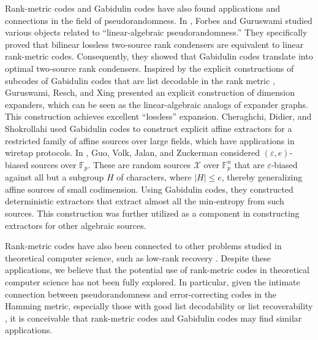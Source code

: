 \documentclass[11pt]{article}
\newif\ifmynotes
\newcommand{\ZGnote}[1]{\ifmynotes\textcolor{purple}{[Zeyu: #1]}\else\fi}
\theoremstyle{plain}
\theoremstyle{definition}
\theoremstyle{remark}
\newcommand{\F}{\mathbb{F}}
\renewcommand{\epsilon}{\varepsilon}
\begin{document}
Rank-metric codes and Gabidulin codes have also found applications and connections in the field of pseudorandomness. In \cite{FG15}, Forbes and Guruswami studied various objects related to ``linear-algebraic pseudorandomness.'' They specifically proved that bilinear lossless two-source rank condensers are equivalent to linear rank-metric codes. Consequently, they showed that Gabidulin codes translate into optimal two-source rank condensers.
Inspired by the explicit constructions of subcodes of Gabidulin codes that are list decodable in the rank metric \cite{GX13, GWX16}, Guruswami, Resch, and Xing \cite{GRX21} presented an explicit construction of dimension expanders, which can be seen as the linear-algebraic analogs of expander graphs. This construction achieves excellent ``lossless'' expansion.
Cheraghchi, Didier, and Shokrollahi \cite{MDS11} used Gabidulin codes to construct explicit affine extractors for a restricted family of affine sources over large fields, which have applications in wiretap protocols.
In \cite{GVJZ23}, Guo, Volk, Jalan, and Zuckerman considered $(\epsilon, e)$-biased sources over $\F_p$. These are random sources $\mathcal{X}$ over $\F_p^n$ that are $\epsilon$-biased against all but a subgroup $H$ of characters, where $|H| \leq e$, thereby generalizing affine sources of small codimension. Using Gabidulin codes, they constructed deterministic extractors that extract almost all the min-entropy from such sources. This construction was further utilized as a component in constructing extractors for other algebraic sources.

Rank-metric codes have also been connected to other problems studied in theoretical computer science, such as low-rank recovery \cite{FS12}. Despite these applications, we believe that the potential use of rank-metric codes in theoretical computer science has not been fully explored. In particular, given the intimate connection between pseudorandomness and error-correcting codes in the Hamming metric, especially those with good list decodability or list recoverability \cite{GUV09, Vad12}, it is conceivable that rank-metric codes and Gabidulin codes may find similar applications. %

\iffalse
\end{document}
